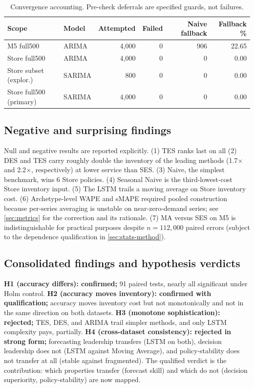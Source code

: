 \begin{table}[H]
\centering
\caption{Convergence accounting. Pre-check deferrals are specified guards, not failures.}
\label{tab:conv}
\begin{tabular}{llrrrr}
\toprule
Scope & Model & Attempted & Failed & Naive fallback & Fallback \% \\
\midrule
M5 full500 & ARIMA & 4,000 & 0 & 906 & 22.65 \\
Store full500 & ARIMA & 4,000 & 0 & 0 & 0.00 \\
Store subset (explor.) & SARIMA & 800 & 0 & 0 & 0.00 \\
Store full500 (primary) & SARIMA & 4,000 & 0 & 0 & 0.00 \\
\bottomrule
\end{tabular}
\end{table}

\subsection{Negative and surprising findings}
\label{sec:negative}
Null and negative results are reported explicitly. (1) TES ranks last on all
(2) DES and TES carry roughly double the
inventory of the leading methods (1.7$\times$ and 2.2$\times$, respectively) at lower service than SES. (3) Naive, the
simplest benchmark, wins 6 Store policies. (4) Seasonal Naive is the
third-lowest-cost Store inventory input. (5) The LSTM trails a moving average
on Store inventory cost. (6) Archetype-level WAPE and sMAPE required pooled
construction because per-series averaging is unstable on near-zero-demand
series; see \cref{sec:metrics} for the correction and its rationale. (7) MA
versus SES on M5 is indistinguishable for practical purposes despite
$n=112{,}000$ paired errors (subject to the dependence qualification in
\cref{sec:stats-method}).

\subsection{Consolidated findings and hypothesis verdicts}
\label{sec:verdicts}
\textbf{H1 (accuracy differs): confirmed;} 91 paired tests, nearly all
significant under Holm control. \textbf{H2 (accuracy moves inventory):
confirmed with qualification;} accuracy moves inventory cost but not
monotonically and not in the same direction on both datasets. \textbf{H3
(monotone sophistication): rejected;} TES, DES, and ARIMA trail simpler
methods, and only LSTM complexity pays, partially. \textbf{H4
(cross-dataset consistency): rejected in strong form;} forecasting leadership
transfers (LSTM on both), decision leadership does not (LSTM against Moving
Average), and policy-stability does not transfer at all (stable against
fragmented). The qualified verdict is the contribution: which properties
transfer (forecast skill) and which do not (decision superiority,
policy-stability) are now mapped.
